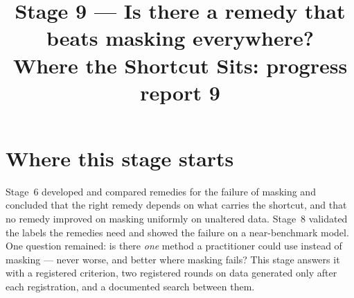 

\newcommand{\notY}{1 = melanoma, malignant nodule, tumour with a solid component, erosion}
\newcommand{\notA}{a real artifact: hair, sonographer caliper, capsule debris}
\newcommand{\notROI}{lesion, nodule, tumour, union of expert lesion boxes}
\newcommand{\notCross}{$[\text{mask}-\text{ERM}]_{\text{Trap B}}-[\text{mask}-\text{ERM}]_{\text{Trap A}}$ of reversed-test AUROC (Stage~3).}
\newcommand{\notCI}{95\% crossed seed$\times$image bootstrap interval (Stage~1), 10{,}000 replicates; one-sided tests at 0.025.}
\newcommand{\notExtra}{Candidate & a remedy compared with masking: every contrast is candidate $-$ masking, AUROC. \\ Dominates & meets every component of the registered criterion (Table~\ref{tab:crit}). \\ Easy / conflicting / same-artifact pairs & positive--negative pairs whose artifact status follows / conflicts with the association, or is the same in both images (Stage~5). \\ Development / confirmation & data used to choose a candidate's settings / data generated only after its registration. \\}
\title{\textbf{Stage 9 --- Is there a remedy that beats masking everywhere?}\\[3pt]\large Where the Shortcut Sits: progress report 9}
\author{}
\date{}

\maketitle
{}


\tableofcontents
\clearpage

\section{Where this stage starts}
Stage~6 developed and compared remedies for the failure of masking and concluded that the right remedy depends on what
carries the shortcut, and that no remedy improved on masking uniformly on unaltered data. Stage~8 validated the labels
the remedies need and showed the failure on a near-benchmark model. One question remained: is there \emph{one} method a
practitioner could use instead of masking --- never worse, and better where masking fails? This stage answers it with a
registered criterion, two registered rounds on data generated only after each registration, and a documented search
between them.

